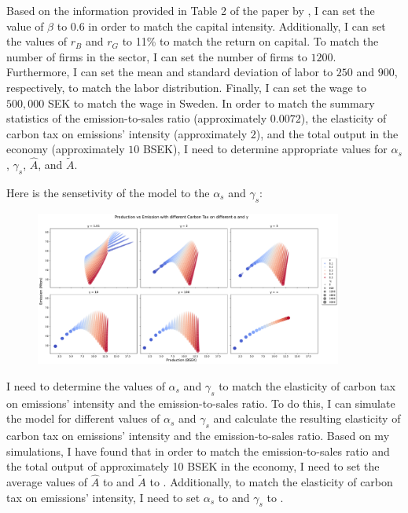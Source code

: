 \documentclass[12pt]{article} %
\begin{document}
    

Based on the information provided in Table 2 of the paper by \cite{martinsson2024effect}, I can set the value of $\beta$ to 0.6 in order to match the capital intensity. Additionally, I can set the values of $r_B$ and $r_G$ to 11\% to match the return on capital. To match the number of firms in the sector, I can set the number of firms to $1200$. Furthermore, I can set the mean and standard deviation of labor to $250$ and $900$, respectively, to match the labor distribution. Finally, I can set the wage to $500,000$ SEK to match the wage in Sweden. In order to match the summary statistics of the emission-to-sales ratio (approximately $0.0072$), the elasticity of carbon tax on emissions' intensity (approximately $2$), and the total output in the economy (approximately $10$ BSEK), I need to determine appropriate values for $\alpha_s$, $\gamma_s$, $\hat{A}$, and $\tilde{A}$.

Here is the sensetivity of the model to the $\alpha_s$ and $\gamma_s$:
    \begin{figure}[http]
		\centering
		\includegraphics[width=0.9\textwidth]{Figures/production_emission.pdf}
	\end{figure}

I need to determine the values of $\alpha_s$ and $\gamma_s$ to match the elasticity of carbon tax on emissions' intensity and the emission-to-sales ratio. To do this, I can simulate the model for different values of $\alpha_s$ and $\gamma_s$ and calculate the resulting elasticity of carbon tax on emissions' intensity and the emission-to-sales ratio. Based on my simulations, I have found that in order to match the emission-to-sales ratio and the total output of approximately 10 BSEK in the economy, I need to set the average values of $\hat{A}$ to  and $\tilde{A}$ to . Additionally, to match the elasticity of carbon tax on emissions' intensity, I need to set $\alpha_s$ to  and $\gamma_s$ to .
    
\end{document}

